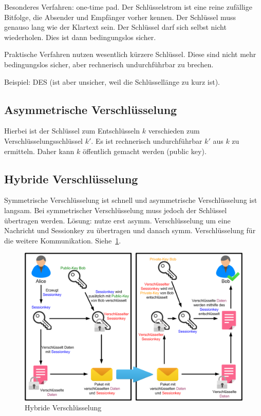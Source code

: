Besonderes Verfahren: one-time pad.
Der Schlüsselstrom ist eine reine zufällige Bitfolge, die Absender und Empfänger vorher
kennen.
Der Schlüssel muss genauso lang wie der Klartext sein.
Der Schlüssel darf sich selbst nicht wiederholen.
Dies ist dann bedingungslos sicher.

Praktische Verfahren nutzen wesentlich kürzere Schlüssel.
Diese sind nicht mehr bedingungslos sicher, aber rechnerisch undurchführbar zu brechen.

Beispiel: DES (ist aber unsicher, weil die Schlüssellänge zu kurz ist).

\subsection{Asymmetrische Verschlüsselung}%
\label{sub:asymmetrische_verschlusselung}

Hierbei ist der Schlüssel zum Entschlüsseln $k$ verschieden zum Verschlüsselungsschlüssel
$k'$.
Es ist rechnerisch undurchführbar $k'$ aus $k$ zu ermitteln.
Daher kann $k$ öffentlich gemacht werden (public key).

\subsection{Hybride Verschlüsselung}%
\label{sub:hybride_verschlusselung}

Symmetrische Verschlüsselung ist schnell und asymmetrische Verschlüsselung ist langsam.
Bei symmetrischer Verschlüsselung muss jedoch der Schlüssel übertragen werden.
Lösung: nutze erst asymm. Verschlüsselung um eine Nachricht und Sessionkey zu übertragen
und danach symm. Verschlüsselung für die weitere Kommunikation.
Siehe~\ref{fig:Hybride_Verschlüsselung}.

\begin{figure}[h]
  \centering
  \includegraphics[width=0.9\linewidth]{bilder/Hybride_Verschluesselung.png}
  \caption{Hybride Verschlüsselung}
  \label{fig:Hybride_Verschlüsselung}
\end{figure}

